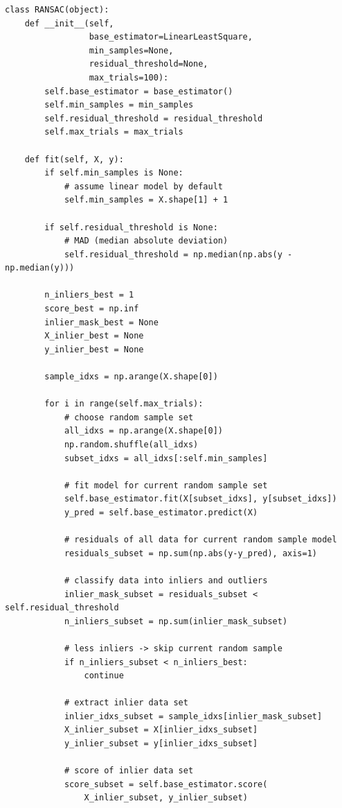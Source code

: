 \documentclass{article}
\begin{document}
\begin{lstlisting}[title={RANSAC代码}]
class RANSAC(object):
    def __init__(self,
                 base_estimator=LinearLeastSquare,
                 min_samples=None,
                 residual_threshold=None,
                 max_trials=100):
        self.base_estimator = base_estimator()
        self.min_samples = min_samples
        self.residual_threshold = residual_threshold
        self.max_trials = max_trials

    def fit(self, X, y):
        if self.min_samples is None:
            # assume linear model by default
            self.min_samples = X.shape[1] + 1

        if self.residual_threshold is None:
            # MAD (median absolute deviation)
            self.residual_threshold = np.median(np.abs(y - np.median(y)))

        n_inliers_best = 1
        score_best = np.inf
        inlier_mask_best = None
        X_inlier_best = None
        y_inlier_best = None

        sample_idxs = np.arange(X.shape[0])

        for i in range(self.max_trials):
            # choose random sample set
            all_idxs = np.arange(X.shape[0])
            np.random.shuffle(all_idxs)
            subset_idxs = all_idxs[:self.min_samples]

            # fit model for current random sample set
            self.base_estimator.fit(X[subset_idxs], y[subset_idxs])
            y_pred = self.base_estimator.predict(X)

            # residuals of all data for current random sample model
            residuals_subset = np.sum(np.abs(y-y_pred), axis=1)

            # classify data into inliers and outliers
            inlier_mask_subset = residuals_subset < self.residual_threshold
            n_inliers_subset = np.sum(inlier_mask_subset)

            # less inliers -> skip current random sample
            if n_inliers_subset < n_inliers_best:
                continue

            # extract inlier data set
            inlier_idxs_subset = sample_idxs[inlier_mask_subset]
            X_inlier_subset = X[inlier_idxs_subset]
            y_inlier_subset = y[inlier_idxs_subset]

            # score of inlier data set
            score_subset = self.base_estimator.score(
                X_inlier_subset, y_inlier_subset)


\end{lstlisting}
\end{document}
